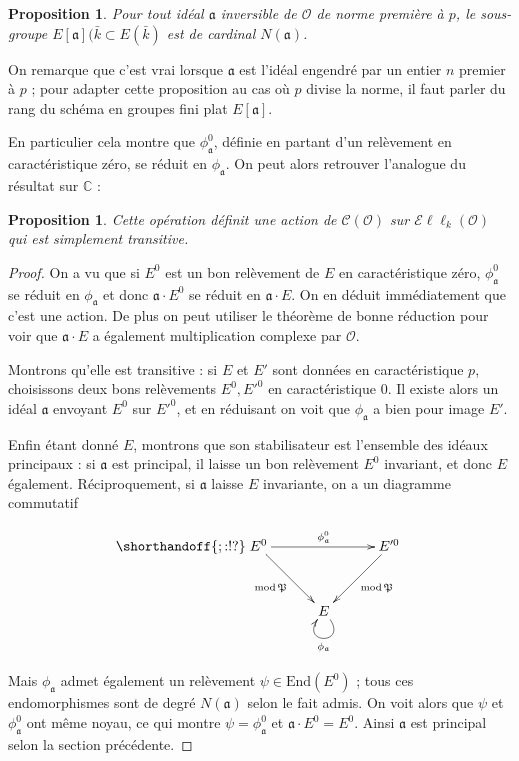 \documentclass[11pt,a4paper]{article}
\newcommand{\C}{\mathbb{C}}
\renewcommand{\O}{\mathcal{O}}
\newcommand{\Cl}{\mathcal{C}}
\newcommand{\End}{\mathrm{End}}
\newcommand{\Ell}{\mathcal{E}\ell\ell}
\renewcommand{\frak}{\mathfrak}
\newtheorem{prop}[thm]{Proposition}
\theoremstyle{definition}
\begin{document}
\begin{prop}

Pour tout idéal $\frak a$ inversible de $\O$ de norme première à $p$, le sous-groupe $E[\frak a](\bar{k}\subset E(\bar{k})$ est de cardinal $N(\frak a)$.

\end{prop}

On remarque que c'est vrai lorsque $\frak a$ est l'idéal engendré par un entier $n$ premier à $p$ ; pour adapter cette proposition au cas où $p$ divise la norme, il faut parler du rang du schéma en groupes fini plat $E[\frak a]$.

En particulier cela montre que $\phi_{\frak a}^0$, définie en partant d'un relèvement en caractéristique zéro, se réduit en $\phi_{\frak a}$. On peut alors retrouver l'analogue du résultat sur $\C$ :

\begin{prop}

Cette opération définit une action de $\Cl(\O)$ sur $\Ell_k(\O)$ qui est simplement transitive.

\end{prop}

\begin{proof}

On a vu que si $E^0$ est un bon relèvement de $E$ en caractéristique zéro, $\phi_{\frak a}^0$ se réduit en $\phi_{\frak a}$ et donc $\frak a\cdot E^0$ se réduit en $\frak a\cdot E$. On en déduit immédiatement que c'est une action. De plus on peut utiliser le théorème de bonne réduction pour voir que $\frak a\cdot E$ a également multiplication complexe par $\O$.

Montrons qu'elle est transitive : si $E$ et $E'$ sont données en caractéristique $p$, choisissons deux bons relèvements $E^0, E'^0$ en caractéristique 0. Il existe alors un idéal $\frak a$ envoyant $E^0$ sur $E'^0$, et en réduisant on voit que $\phi_{\frak a}$ a bien pour image $E'$.

Enfin étant donné $E$, montrons que son stabilisateur est l'ensemble des idéaux principaux : si $\frak a$ est principal, il laisse un bon relèvement $E^0$ invariant, et donc $E$ également. Réciproquement, si $\frak a$ laisse $E$ invariante, on a un diagramme commutatif

$$
\shorthandoff{;:!?}
\xymatrix @!=8mm {
E^0 \ar[rr]^{\phi_{\frak a}^0} \ar[rd]_{\mathrm{mod}\,\frak P} & & E'^0 \ar[ld]^{\mathrm{mod}\,\frak P} \\
 & E \ar@(dr,dl)^{\phi_{\frak a}} & 
}
$$

Mais $\phi_{\frak a}$ admet également un relèvement $\psi\in \End(E^0)$ ; tous ces endomorphismes sont de degré $N(\frak a)$ selon le fait admis. On voit alors que $\psi$ et $\phi_{\frak a}^0$ ont même noyau, ce qui montre $\psi=\phi_{\frak a}^0$ et $\frak a\cdot E^0 = E^0$. Ainsi $\frak a$ est principal selon la section précédente.
\end{proof}
\end{document}
